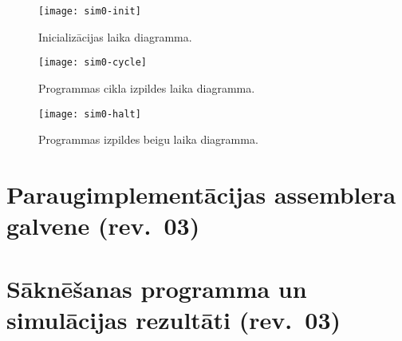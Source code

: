 

\begin{sidewaysfigure}
	\centering
	\texttt{[image: sim0-init]}\\
	\caption{Inicializācijas laika diagramma.}
	\label{fig:sim-init}
\end{sidewaysfigure}

\begin{sidewaysfigure}
	\centering
	\texttt{[image: sim0-cycle]}\\
	\caption{Programmas cikla izpildes laika diagramma.}
	\label{fig:sim-cycle}
\end{sidewaysfigure}

\begin{sidewaysfigure}
	\centering
	\texttt{[image: sim0-halt]}\\
	\caption{Programmas izpildes beigu laika diagramma.}
	\label{fig:sim-halt}
\end{sidewaysfigure}



\clearpage
\section{Paraugimplementācijas assemblera galvene (rev.~03)}


\clearpage
\section{Sāknēšanas programma un simulācijas rezultāti (rev.~03)} \label{appx:boot}


